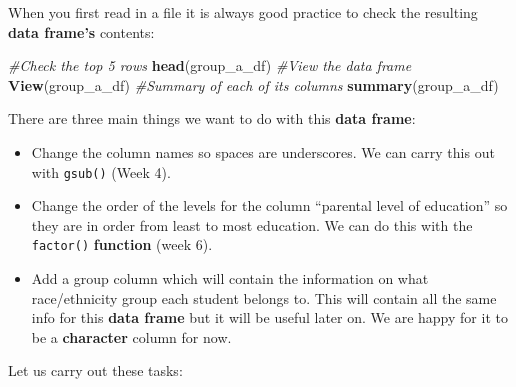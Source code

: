 \documentclass[]{book}
\newenvironment{Shaded}{\begin{snugshade}}{\end{snugshade}}
\newcommand{\KeywordTok}[1]{\textcolor[rgb]{0.13,0.29,0.53}{\textbf{#1}}}
\newcommand{\CommentTok}[1]{\textcolor[rgb]{0.56,0.35,0.01}{\textit{#1}}}
\newcommand{\NormalTok}[1]{#1}
\providecommand{\tightlist}{%
  \setlength{\itemsep}{0pt}\setlength{\parskip}{0pt}}
\begin{document}
When you first read in a file it is always good practice to check the
resulting \textbf{data frame's} contents:

\begin{Shaded}
\begin{Highlighting}[]
\CommentTok{#Check the top 5 rows}
\KeywordTok{head}\NormalTok{(group_a_df)}
\CommentTok{#View the data frame}
\KeywordTok{View}\NormalTok{(group_a_df)}
\CommentTok{#Summary of each of its columns}
\KeywordTok{summary}\NormalTok{(group_a_df)}
\end{Highlighting}
\end{Shaded}

There are three main things we want to do with this \textbf{data frame}:

\begin{itemize}
\tightlist
\item
  Change the column names so spaces are underscores. We can carry this
  out with \texttt{gsub()} (Week 4).
\item
  Change the order of the levels for the column ``parental level of
  education'' so they are in order from least to most education. We can
  do this with the \texttt{factor()} \textbf{function} (week 6).
\item
  Add a group column which will contain the information on what
  race/ethnicity group each student belongs to. This will contain all
  the same info for this \textbf{data frame} but it will be useful later
  on. We are happy for it to be a \textbf{character} column for now.
\end{itemize}

Let us carry out these tasks:
\end{document}
